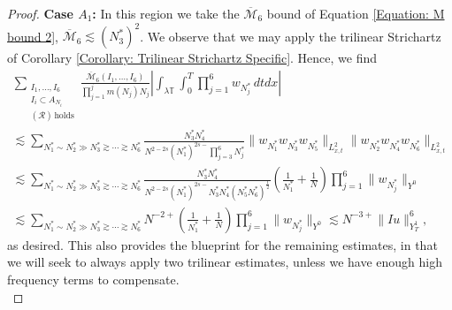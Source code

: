 \documentclass[12pt, letterpaper]{amsart}
\begin{document}
\begin{proof}
    \textbf{Case $A_1$: } In this region we take the $\overline{\mathcal{M}}_6$ bound of Equation \eqref{Equation: M bound 2}, $\overline{\mathcal{M}}_6\lesssim (N_3^*)^2$. We observe that we may apply the trilinear Strichartz of Corollary \ref{Corollary: Trilinear Strichartz Specific}. Hence, we find
    \begin{multline*}
        \sum_{\substack{I_1,\dots, I_6\\I_i\subset A_{N_i}\\(\mathcal{R})\,\mathrm{ holds}}}\frac{\overline{\mathcal{M}}_6(I_1,\dots, I_6)}{\prod_{j=1}^jm(N_j)N_j}\left|\int_{\lambda\mathbb{T}}\int_0^T\prod_{j=1}^6w_{N_j^*}\,dtdx\right|\\
        \lesssim \sum_{N_1^*\sim N_2^*\gg N_3^*\gtrsim\cdots\gtrsim N_6^*}\frac{N_3^*N_4^*}{N^{2-2s}(N_1^*)^{2s-}\prod_{j=3}^6N_j^*}\|w_{N_1^*}w_{N_3^*}w_{N_5^*}\|_{L^2_{x,t}}\|w_{N_2^*}w_{N_4^*}w_{N_6^*}\|_{L^2_{x,t}}\\
        \lesssim \sum_{N_1^*\sim N_2^*\gg N_3^*\gtrsim\cdots\gtrsim N_6^*}\frac{N_3^*N_4^*}{N^{2-2s}(N_1^*)^{2s-}N_3^*N_4^*(N_5^*N_6^*)^\frac{1}{2}}\left(\frac{1}{N_1^*} + \frac{1}{N}\right)\prod_{j=1}^6\|w_{N_j^*}\|_{Y^0}\\
        \lesssim \sum_{N_1^*\sim N_2^*\gg N_3^*\gtrsim\cdots\gtrsim N_6^*}N^{-2+}\left(\frac{1}{N_1^*} + \frac{1}{N}\right)\prod_{j=1}^6\|w_{N_j^*}\|_{Y^0}\lesssim N^{-3+}\|Iu\|_{Y^1_T}^6,
    \end{multline*}
    as desired. This also provides the blueprint for the remaining estimates, in that we will seek to always apply two trilinear estimates, unless we have enough high frequency terms to compensate.\\


\end{proof}
\end{document}
